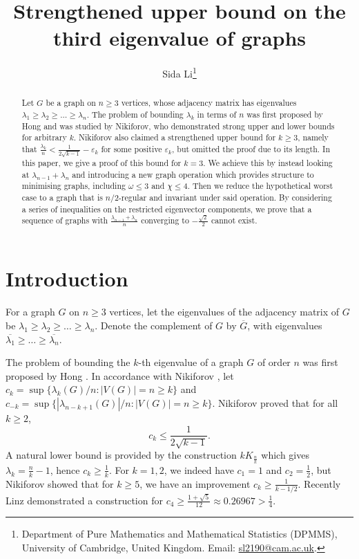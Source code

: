\documentclass[11pt]{article}
\title{Strengthened upper bound on the third eigenvalue of graphs}
\author{Sida Li\thanks{Department of Pure Mathematics and Mathematical Statistics
(DPMMS), University of Cambridge, United Kingdom. Email: \href{mailto:sl2190@cam.ac.uk}{sl2190@cam.ac.uk}.}}
\date{}
\begin{document}
\maketitle

\begin{abstract}
    Let $G$ be a graph on $n \ge 3$ vertices, whose adjacency matrix has eigenvalues $\lambda_1 \ge \lambda_2 \ge \dots \ge \lambda_n$. The problem of bounding $\lambda_k$ in terms of $n$ was first proposed by Hong and was studied by Nikiforov, who demonstrated strong upper and lower bounds for arbitrary $k$. Nikiforov also claimed a strengthened upper bound for $k \ge 3$, namely that $\frac{\lambda_k}{n} < \frac{1}{2\sqrt{k-1}} - \varepsilon_k$ for some positive $\varepsilon_k$, but omitted the proof due to its length. In this paper, we give a proof of this bound for $k = 3$. We achieve this by instead looking at $\lambda_{n-1} + \lambda_n$ and introducing a new graph operation which provides structure to minimising graphs, including $\omega \le 3$ and $\chi \le 4$. Then we reduce the hypothetical worst case to a graph that is $n/2$-regular and invariant under said operation. By considering a series of inequalities on the restricted eigenvector components, we prove that a sequence of graphs with $\frac{\lambda_{n-1} + \lambda_n}{n}$ converging to $-\frac{\sqrt{2}}{2}$ cannot exist. 
\end{abstract}

\section{Introduction}

For a graph $G$ on $n \ge 3$ vertices, let the eigenvalues of the adjacency matrix of $G$ be $\lambda_1 \ge \lambda_2 \ge \dots \ge \lambda_n$. Denote the complement of $G$ by $\overline{G}$, with eigenvalues $\overline{\lambda_1} \ge \dots \ge \overline{\lambda_n}$. 

The problem of bounding the $k$-th eigenvalue of a graph $G$ of order $n$ was first proposed by Hong \cite{hong1993bounds}. In accordance with Nikiforov \cite{nikiforov2015extrema}, let $c_k = \sup\{\lambda_k(G)/n : |V(G)| = n \ge k\}$ and $c_{-k} = \sup\{|\lambda_{n-k+1}(G)|/n : |V(G)| = n \ge k\}$. Nikiforov proved that for all $k \ge 2$,
\[c_k \le \frac{1}{2\sqrt{k-1}}.\]
A natural lower bound is provided by the construction $kK_{\frac{n}{k}}$ which gives $\lambda_k = \frac{n}{k} - 1$, hence $c_k \ge \frac{1}{k}$. For $k = 1, 2$, we indeed have $c_1 = 1$ and $c_2 = \frac12$, but Nikiforov showed that for $k \ge 5$, we have an improvement $c_k \ge \frac{1}{k - 1/2}$. Recently Linz \cite{linz2023improved} demonstrated a construction for $c_4 \ge \frac{1+\sqrt{5}}{12} \approx 0.26967 > \frac14$. 
\end{document}
